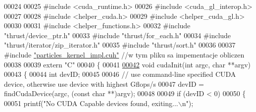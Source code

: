 \begin{DoxyCode}
00024 
00025 \textcolor{preprocessor}{#}\textcolor{preprocessor}{include} \textcolor{preprocessor}{<}\textcolor{preprocessor}{cuda\_runtime}\textcolor{preprocessor}{.}\textcolor{preprocessor}{h}\textcolor{preprocessor}{>}
00026 \textcolor{preprocessor}{#}\textcolor{preprocessor}{include} \textcolor{preprocessor}{<}\textcolor{preprocessor}{cuda\_gl\_interop}\textcolor{preprocessor}{.}\textcolor{preprocessor}{h}\textcolor{preprocessor}{>}
00027 
00028 \textcolor{preprocessor}{#}\textcolor{preprocessor}{include} \textcolor{preprocessor}{<}\textcolor{preprocessor}{helper\_cuda}\textcolor{preprocessor}{.}\textcolor{preprocessor}{h}\textcolor{preprocessor}{>}
00029 \textcolor{preprocessor}{#}\textcolor{preprocessor}{include} \textcolor{preprocessor}{<}\textcolor{preprocessor}{helper\_cuda\_gl}\textcolor{preprocessor}{.}\textcolor{preprocessor}{h}\textcolor{preprocessor}{>}
00030 
00031 \textcolor{preprocessor}{#}\textcolor{preprocessor}{include} \textcolor{preprocessor}{<}\textcolor{preprocessor}{helper\_functions}\textcolor{preprocessor}{.}\textcolor{preprocessor}{h}\textcolor{preprocessor}{>}
00032 \textcolor{preprocessor}{#}\textcolor{preprocessor}{include} \textcolor{preprocessor}{"thrust/device\_ptr.h"}
00033 \textcolor{preprocessor}{#}\textcolor{preprocessor}{include} \textcolor{preprocessor}{"thrust/for\_each.h"}
00034 \textcolor{preprocessor}{#}\textcolor{preprocessor}{include} \textcolor{preprocessor}{"thrust/iterator/zip\_iterator.h"}
00035 \textcolor{preprocessor}{#}\textcolor{preprocessor}{include} \textcolor{preprocessor}{"thrust/sort.h"}
00036 
00037 \textcolor{preprocessor}{#}\textcolor{preprocessor}{include} \hyperlink{particles__kernel__impl_8cuh}{"particles\_kernel\_impl.cuh"}                               \textcolor{comment}{//w tym
       pliku sa impementacje obliczen}
00038 
00039 \textcolor{keyword}{extern} \textcolor{stringliteral}{"C"}
00040 \{
00041 
\hypertarget{particle_system__cuda_8cu_source_l00042}{}\hyperlink{particle_system__cuda_8cu_ad205012a960928f6fb61ea4f51a95e9f}{00042}     \textcolor{keywordtype}{void} cudaInit(\textcolor{keywordtype}{int} argc, \textcolor{keywordtype}{char} **argv)
00043     \{
00044         \textcolor{keywordtype}{int} devID;
00045 
00046         \textcolor{comment}{// use command-line specified CUDA device, otherwise use device with highest Gflops/s}
00047         devID = findCudaDevice(argc, (\textcolor{keyword}{const} \textcolor{keywordtype}{char} **)argv);
00048 
00049         \textcolor{keywordflow}{if} (devID < 0)
00050         \{
00051             printf(\textcolor{stringliteral}{"No CUDA Capable devices found, exiting...\(\backslash\)n"});

\end{DoxyCode}
